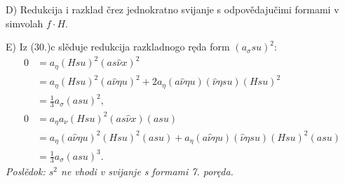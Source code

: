\documentclass[11pt]{article}
\begin{document}
D) Redukcija i razklad črez jednokratno svijanje s odpovědajučimi formami v simvolah $f\cdot H$.

E) Iz (30.)c slěduje redukcija razkladnogo ręda form $(a_\sigma su)^2$:
\[
\begin{aligned}
0&=a_\eta(Hsu)^2(as\widehat{\nu}x)^2\\
&=a_\eta(Hsu)^2(a\widehat{\nu}\eta u)^2
  +2a_\eta(a\widehat{\nu}\eta u)(\widehat{\nu}\eta su)(Hsu)^2\\
&=\frac13a_\sigma(asu)^2,\\
0&=a_\eta a_{\nu}(Hsu)^2(as\widehat{\nu}x)(asu)\\
&=a_\eta(a\widehat{\nu}\eta u)^2(Hsu)^2(asu)
  +a_\eta(a\widehat{\nu}\eta u)(\widehat{\nu}\eta su)(Hsu)^2(asu)\\
&=\frac13a_\sigma(asu)^3.
\end{aligned}
\]
\noindent\textit{Poslědok: $s^2$ ne vhodi v svijanje s formami 7. poręda.}
\end{document}
